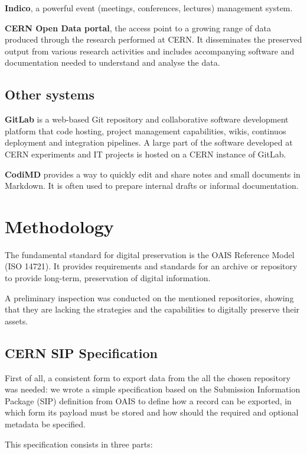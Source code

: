 \documentclass[11pt]{IEEEtran}
\begin{document}
\textbf{Indico}, a powerful event (meetings, conferences, lectures) management system.

\textbf{CERN Open Data portal}, the access point to a growing range of data produced through the research performed at CERN. It disseminates the preserved output from various research activities and includes accompanying software and documentation needed to understand and analyse the data.

\subsection{Other systems}


\textbf{GitLab} is a web-based Git repository and collaborative software development platform that code hosting, project management capabilities, wikis, continuos deployment and integration pipelines. A large part of the software developed at CERN experiments and IT projects is hosted on a CERN instance of GitLab.

\textbf{CodiMD} provides a way to quickly edit and share notes and small documents in Markdown. It is often used to prepare internal drafts or informal documentation.


\section{Methodology}

The fundamental standard for digital preservation is the OAIS Reference Model\cite{OAIS2002} (ISO 14721). It provides requirements and standards for an archive or repository to provide long-term, preservation of digital information.

A preliminary inspection was conducted on the mentioned repositories, showing that they are lacking the strategies and the capabilities to digitally preserve their assets.

\subsection{CERN SIP Specification}
First of all, a consistent form to export data from the all the chosen repository was needed: we wrote a simple specification based on the Submission Information Package (SIP) definition from OAIS to define how a record can be exported, in which form its payload must be stored and how should the required and optional metadata be specified.

This specification consists in three parts:
\end{document}
